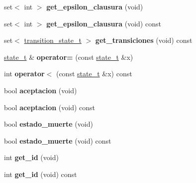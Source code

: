 \begin{DoxyCompactItemize}
\item 
\hypertarget{classstate__t_ab9a1cd5aea3d7e58e66055fcc3979a50}{}\label{classstate__t_ab9a1cd5aea3d7e58e66055fcc3979a50} 
set$<$ int $>$ {\bfseries get\+\_\+epsilon\+\_\+clausura} (void)
\item 
\hypertarget{classstate__t_a5f3292a26bd3f12ddae1f776ebfe524e}{}\label{classstate__t_a5f3292a26bd3f12ddae1f776ebfe524e} 
set$<$ int $>$ {\bfseries get\+\_\+epsilon\+\_\+clausura} (void) const
\item 
\hypertarget{classstate__t_a4152d04e8e2e015cb09fcffabc871bf0}{}\label{classstate__t_a4152d04e8e2e015cb09fcffabc871bf0} 
set$<$ \hyperlink{classtransition__state__t}{transition\+\_\+state\+\_\+t} $>$ {\bfseries get\+\_\+transiciones} (void) const
\item 
\hypertarget{classstate__t_a3d09c8181af4de80369e30484b02389b}{}\label{classstate__t_a3d09c8181af4de80369e30484b02389b} 
\hyperlink{classstate__t}{state\+\_\+t} \& {\bfseries operator=} (const \hyperlink{classstate__t}{state\+\_\+t} \&x)
\item 
\hypertarget{classstate__t_a53175eaffcac47b39b4e68cfc24825bc}{}\label{classstate__t_a53175eaffcac47b39b4e68cfc24825bc} 
int {\bfseries operator$<$} (const \hyperlink{classstate__t}{state\+\_\+t} \&x) const
\item 
\hypertarget{classstate__t_abdcff45d09933d29c82f6bd799e6c4e7}{}\label{classstate__t_abdcff45d09933d29c82f6bd799e6c4e7} 
bool {\bfseries aceptacion} (void)
\item 
\hypertarget{classstate__t_aa3407f6c977c3a4f9e24bea68f20bf23}{}\label{classstate__t_aa3407f6c977c3a4f9e24bea68f20bf23} 
bool {\bfseries aceptacion} (void) const
\item 
\hypertarget{classstate__t_af592672800b8aa03ccd8fc93fcbd5c28}{}\label{classstate__t_af592672800b8aa03ccd8fc93fcbd5c28} 
bool {\bfseries estado\+\_\+muerte} (void)
\item 
\hypertarget{classstate__t_a00e51f0e991c4617582376e26a13e348}{}\label{classstate__t_a00e51f0e991c4617582376e26a13e348} 
bool {\bfseries estado\+\_\+muerte} (void) const
\item 
\hypertarget{classstate__t_af943624510ae0aa7b379a913fc0e3a72}{}\label{classstate__t_af943624510ae0aa7b379a913fc0e3a72} 
int {\bfseries get\+\_\+id} (void)
\item 
\hypertarget{classstate__t_a072ecf68079fa010cabed2c7fc71fe14}{}\label{classstate__t_a072ecf68079fa010cabed2c7fc71fe14} 
int {\bfseries get\+\_\+id} (void) const
\end{DoxyCompactItemize}
